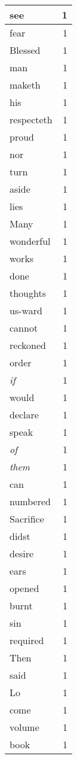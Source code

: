 \begin{center}
\begin{longtable}{l|r}
see & 1 \\ \hline
fear & 1 \\ \hline
Blessed & 1 \\ \hline
man & 1 \\ \hline
maketh & 1 \\ \hline
his & 1 \\ \hline
respecteth & 1 \\ \hline
proud & 1 \\ \hline
nor & 1 \\ \hline
turn & 1 \\ \hline
aside & 1 \\ \hline
lies & 1 \\ \hline
Many & 1 \\ \hline
wonderful & 1 \\ \hline
works & 1 \\ \hline
done & 1 \\ \hline
thoughts & 1 \\ \hline
us-ward & 1 \\ \hline
cannot & 1 \\ \hline
reckoned & 1 \\ \hline
order & 1 \\ \hline
\emph{if} & 1 \\ \hline
would & 1 \\ \hline
declare & 1 \\ \hline
speak & 1 \\ \hline
\emph{of} & 1 \\ \hline
\emph{them} & 1 \\ \hline
can & 1 \\ \hline
numbered & 1 \\ \hline
Sacrifice & 1 \\ \hline
didst & 1 \\ \hline
desire & 1 \\ \hline
ears & 1 \\ \hline
opened & 1 \\ \hline
burnt & 1 \\ \hline
sin & 1 \\ \hline
required & 1 \\ \hline
Then & 1 \\ \hline
said & 1 \\ \hline
Lo & 1 \\ \hline
come & 1 \\ \hline
volume & 1 \\ \hline
book & 1 \\ \hline

\end{longtable}
\end{center}
